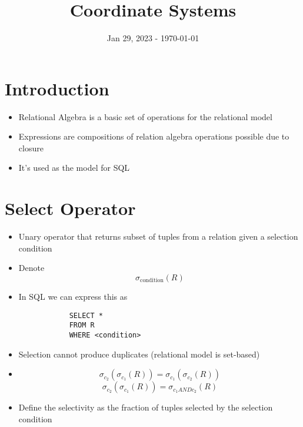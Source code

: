 \documentclass{article}
\title{Coordinate Systems}
\date{Jan 29, 2023 - \today}
\begin{document}
\maketitle
\section{Introduction}
\begin{itemize}
    \item Relational Algebra is a basic set of operations for the relational model
    \item Expressions are compositions of relation algebra operations possible due to closure
    \item It's used as the model for SQL
\end{itemize}
\section{Select Operator}
\begin{itemize}
    \item Unary operator that returns subset of tuples from a relation given a selection condition
    \item Denote
        \begin{equation}
            \sigma_{\text{condition}}(R)
        \end{equation}
    \item In SQL we can express this as
        \begin{verbatim}
            SELECT *
            FROM R
            WHERE <condition>
        \end{verbatim}
    \item Selection cannot produce duplicates (relational model is set-based)
    \item
        \begin{equation}
            \sigma_{c_2}(\sigma_{c_1}(R)) = \sigma_{c_1}(\sigma_{c_2}(R))
    \end{equation}
    \begin{equation}
        \sigma_{c_2}(\sigma_{c_1}(R))  =\sigma_{c_1 AND c_2}(R)
    \end{equation}
\item Define the selectivity as the fraction of tuples selected by the selection condition
\end{itemize}
\end{document}
